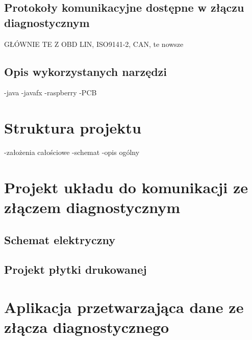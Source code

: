 \documentclass[12pt]{article} %
\numberwithin{equation}{subsection}
\numberwithin{figure}{section}
\numberwithin{table}{section}
\begin{document}
	
		\newpage	
	
	\subsection{Protokoły komunikacyjne dostępne w złączu diagnostycznym}
		\hspace{0.5cm}GŁÓWNIE TE Z OBD LIN, ISO9141-2, CAN,
						te nowsze
	
		\newpage	
	
	\subsection{Opis wykorzystanych narzędzi}
		\hspace{0.5cm}
		-java
		-javafx
		-raspberry
		-PCB
	
		\newpage
	
\section{Struktura projektu}
	\hspace{0.5cm}
	-założenia całościowe
	-schemat
	-opis ogólny	
	
	\newpage	
	
\section{Projekt układu do komunikacji ze złączem diagnostycznym}
	\subsection{Schemat elektryczny}
		\hspace{0.5cm}
	
		\newpage
	
	\subsection{Projekt płytki drukowanej}
		\hspace{0.5cm}
	
		\newpage
	
\section{Aplikacja przetwarzająca dane ze złącza diagnostycznego}
	\hspace{0.5cm}
	
\end{document}
